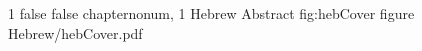 \documentclass[a4paper, 12pt, \pagelayoutformat, onecolumn, bibliography=totoc]{scrreprt}
\begin{document}
        \IncludeMyPDFinReverse
        {\hebabstractpage}
        {1}
        {false}
        {false}
        {chapternonum, 1}
        {Hebrew Abstract}
        {fig:hebCover}
        {figure}
        {Hebrew/hebCover.pdf}

        
    \fi
\fi

\ifLISTFIGS
    \listoffigures
\fi
\end{document}
